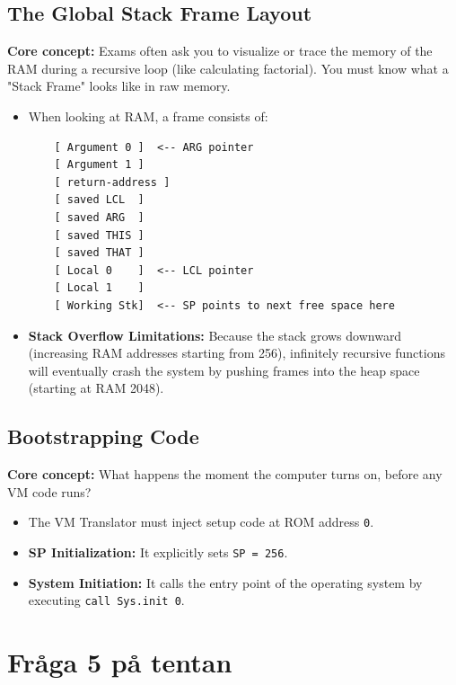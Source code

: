 \documentclass[12pt,a4paper]{article}
\begin{document}
\subsection{The Global Stack Frame Layout}
\textbf{Core concept:} Exams often ask you to visualize or trace the memory of the RAM during a recursive loop (like calculating factorial). You must know what a "Stack Frame" looks like in raw memory.
\begin{itemize}
    \item When looking at RAM, a frame consists of:
    \begin{verbatim}
    [ Argument 0 ]  <-- ARG pointer
    [ Argument 1 ]
    [ return-address ]
    [ saved LCL  ]
    [ saved ARG  ]
    [ saved THIS ]
    [ saved THAT ]  
    [ Local 0    ]  <-- LCL pointer
    [ Local 1    ]
    [ Working Stk]  <-- SP points to next free space here
    \end{verbatim}
    \item \textbf{Stack Overflow Limitations:} Because the stack grows downward (increasing RAM addresses starting from 256), infinitely recursive functions will eventually crash the system by pushing frames into the heap space (starting at RAM 2048).
\end{itemize}

\subsection{Bootstrapping Code}
\textbf{Core concept:} What happens the moment the computer turns on, before any VM code runs?
\begin{itemize}
    \item The VM Translator must inject setup code at ROM address \texttt{0}.
    \item \textbf{SP Initialization:} It explicitly sets \texttt{SP = 256}.
    \item \textbf{System Initiation:} It calls the entry point of the operating system by executing \texttt{call Sys.init 0}.
\end{itemize}

\newpage
\section{Fråga 5 på tentan}
\end{document}
